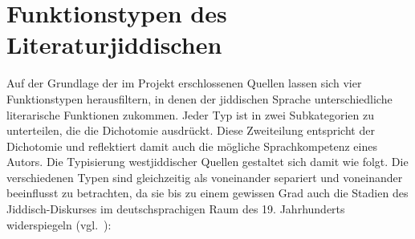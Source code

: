     \section{Funktionstypen des Literaturjiddischen} \label{Kapitel Funktionstypen}
	Auf der Grundlage der im Projekt  erschlossenen Quellen lassen sich vier Funktionstypen herausfiltern, in denen der jiddischen Sprache unterschiedliche literarische Funktionen zukommen. Jeder Typ ist in zwei Subkategorien zu unterteilen, die die Dichotomie  ausdrückt. Diese Zweiteilung entspricht  der Dichotomie  und reflektiert damit auch die mögliche Sprachkompetenz eines Autors. Die Typisierung westjiddischer Quellen gestaltet sich damit wie folgt. Die verschiedenen Typen sind gleichzeitig als voneinander separiert und voneinander beeinflusst zu betrachten, da sie bis zu einem gewissen Grad auch die Stadien des Jiddisch-Diskurses im deutschsprachigen Raum des 19. Jahrhunderts widerspiegeln (vgl.\, \citealt[55–59]{SchaeferDiss}):\\
	
	
	
